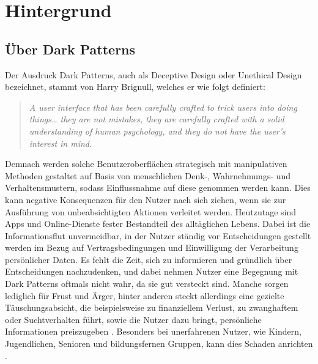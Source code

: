 \documentclass[a4paper]{article}
\begin{document}
\section{Hintergrund}
\label{sec:hintergrund}


\subsection{Über Dark Patterns} 
\label{sub:die_hintergruende_der_dark_patterns}
Der Ausdruck Dark Patterns, auch als  \glqq Deceptive Design\grqq{} oder \glqq Unethical Design\grqq{} bezeichnet, stammt von Harry Brignull, welches er wie folgt definiert:
\begin{quote}
\glqq \textit{A user interface that has been carefully crafted to trick users into doing things… they are not mistakes, they are carefully crafted with a solid understanding of human psychology, and they do not have the user's interest in mind.}\grqq{}
\end{quote}
Demnach werden solche Benutzeroberflächen strategisch mit manipulativen Methoden gestaltet auf Basis von menschlichen Denk-, Wahrnehmungs- und Verhaltensmustern, sodass Einflussnahme auf diese genommen werden kann. Dies kann negative Konsequenzen für den Nutzer nach sich ziehen, wenn sie zur Ausführung von unbeabsichtigten Aktionen verleitet werden.\newline
Heutzutage sind Apps und Online-Dienste fester Bestandteil des alltäglichen Lebens. Dabei ist die Informationsflut unvermeidbar, in der Nutzer ständig vor Entscheidungen gestellt werden im Bezug auf Vertragsbedingungen und Einwilligung der Verarbeitung persönlicher Daten. Es fehlt die Zeit, sich zu informieren und gründlich über Entscheidungen nachzudenken, und dabei nehmen Nutzer eine Begegnung mit Dark Patterns oftmals nicht wahr, da sie gut versteckt sind. Manche sorgen lediglich für Frust und Ärger, hinter anderen steckt allerdings eine gezielte Täuschungsabsicht, die beispielsweise zu finanziellem Verlust, zu zwanghaftem oder Suchtverhalten führt, sowie die Nutzer dazu bringt, persönliche Informationen preiszugeben \cite{mathur}. Besonders bei unerfahrenen Nutzer, wie Kindern, Jugendlichen, Senioren und bildungsfernen Gruppen, kann dies Schaden anrichten \cite{tab}. \newline\newline
\end{document}
